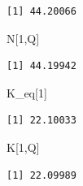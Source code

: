 \documentclass[
  letterpaper,
  DIV=11,
  numbers=noendperiod]{scrreprt}
\newenvironment{Shaded}{\begin{snugshade}}{\end{snugshade}}
\newcommand{\DecValTok}[1]{\textcolor[rgb]{0.68,0.00,0.00}{#1}}
\newcommand{\NormalTok}[1]{\textcolor[rgb]{0.00,0.23,0.31}{#1}}
\begin{document}
\begin{verbatim}
[1] 44.20066
\end{verbatim}

\begin{Shaded}
\begin{Highlighting}[]
\NormalTok{N[}\DecValTok{1}\NormalTok{,Q]}
\end{Highlighting}
\end{Shaded}

\begin{verbatim}
[1] 44.19942
\end{verbatim}

\begin{Shaded}
\begin{Highlighting}[]
\NormalTok{K\_eq[}\DecValTok{1}\NormalTok{]}
\end{Highlighting}
\end{Shaded}

\begin{verbatim}
[1] 22.10033
\end{verbatim}

\begin{Shaded}
\begin{Highlighting}[]
\NormalTok{K[}\DecValTok{1}\NormalTok{,Q]}
\end{Highlighting}
\end{Shaded}

\begin{verbatim}
[1] 22.09989
\end{verbatim}
\end{document}
